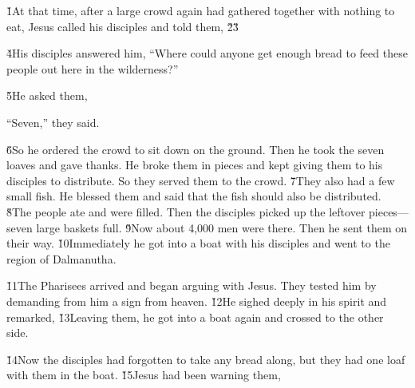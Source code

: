 \v{1}At that time, after a large crowd again had gathered together with nothing to eat, Jesus called his disciples and told them, \v{2}\red{,}\v{3}

\v{4}His disciples answered him, ``Where could anyone get enough bread to feed these people out here in the wilderness?''

\v{5}He asked them, 

``Seven,'' they said.

\v{6}So he ordered the crowd to sit down on the ground. Then he took the seven loaves and gave thanks. He broke them in pieces and kept giving them to his disciples to distribute. So they served them to the crowd. \v{7}They also had a few small fish. He blessed them and said that the fish should also be distributed. \v{8}The people ate and were filled. Then the disciples picked up the leftover pieces---seven large baskets full. \v{9}Now about 4,000 men were there. Then he sent them on their way. \v{10}Immediately he got into a boat with his disciples and went to the region of Dalmanutha.

\v{11}The Pharisees arrived and began arguing with Jesus. They tested him by demanding from him a sign from heaven. \v{12}He sighed deeply in his spirit and remarked,  \v{13}Leaving them, he got into a boat again and crossed to the other side.

\v{14}Now the disciples had forgotten to take any bread along, but they had one loaf with them in the boat. \v{15}Jesus had been warning them, 

